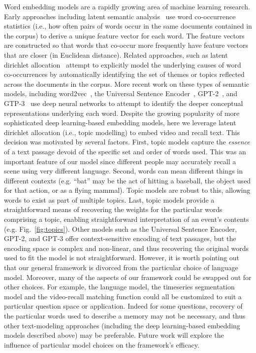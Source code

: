 \documentclass{article}
\begin{document}
Word embedding models are a rapidly growing area of machine learning research.  Early approaches including latent
  semantic analysis~\citep{LandDuma97} use word co-occurrence statistics (i.e., how often pairs of words occur in the same documents contained in the corpus) to derive a unique feature vector for each word.  The feature vectors are constructed so that words that co-occur more frequently have feature vectors that are closer (in Euclidean distance).  Related approaches, such as latent dirichlet
  allocation~\citep{BleiEtal03} attempt to explicitly model the underlying causes of word co-occurrences by automatically identifying the set of themes or topics reflected across the documents in the corpus.  More recent work on these types of semantic models, including word2vec~\citep{MikoEtal13}, the Universal Sentence Encoder~\citep{CerEtal18}, GPT-2~\citep{RadfEtal19}, and GTP-3~\citep{BrowEtal20} use deep neural networks to attempt to identify the deeper conceptual representations underlying each word.  Despite the growing popularity of more sophisticated deep learning-based embedding models, here we leverage latent dirichlet allocation (i.e., topic modelling) to embed video and recall text.  This decision was motivated by several factors.  First, topic models capture the \textit{essence} of a text passage devoid of the specific set and order of words used.  This was an important feature of our model since different people may accurately recall a scene using very different language. Second, words can mean different things in different contexts (e.g. ``bat'' may be the act of hitting a baseball, the object used for that action, or as a flying mammal).  Topic models are robust to this, allowing words to exist as part of multiple topics.  Last, topic models provide a straightforward means of recovering the weights for the particular words comprising a topic, enabling straightforward interpretation of an event's contents (e.g. Fig.~\ref{fig:topics}). Other models such as the Universal Sentence Encoder, GPT-2, and GPT-3 offer context-sensitive encoding of text passages, but the encoding space is complex and non-linear, and thus recovering the original words used to fit the model is not straightforward. However, it is worth pointing out that our general framework is divorced from the particular choice of language model. Moreover, many of the aspects of our framework could be swapped out for other choices. For example, the language model, the timeseries segmentation model and the video-recall matching function could all be customized to suit a particular question space or application. Indeed for some questions, recovery of the particular words used to describe a memory may not be necessary, and thus other text-modeling approaches (including the deep learning-based embedding models described above) may be preferable. Future work will explore the influence of particular model choices on the framework's efficacy.
\end{document}
